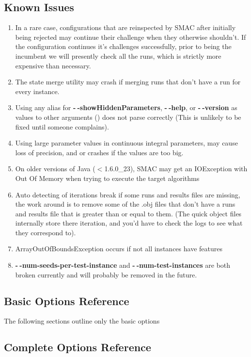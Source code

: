 \documentclass[11pt,letterpaper,oneside]{article}
\begin{document}
\subsection{Known Issues}
\label{known-issues}
\begin{enumerate}
\item In a rare case, configurations that are reinspected by SMAC after initially being rejected may continue their challenge when they otherwise shouldn't. If the configuration continues it's challenges successfully, prior to being the incumbent we will presently check all the runs, which is strictly more expensive than necessary.
\item The state merge utility may crash if merging runs that don't have a run for every instance.
\item Using any alias for \textbf{-$~\!$-showHiddenParameters}, \textbf{-$~\!$-help}, or \textbf{-$~\!$-version} as values to other arguments () does not parse correctly (This is unlikely to be fixed until someone complains).
\item Using large parameter values in continuous integral parameters, may cause loss of precision, and or crashes if the values are too big.
\item On older versions of Java ($<$1.6.0\_23), SMAC  may get an IOException with Out Of Memory when trying to execute the target algorithms
\item Auto detecting of iterations break if some runs and results files are missing, the work around is to remove some of the .obj files that don't have a runs and results file that is greater than or equal to them. (The quick object files internally store there iteration, and you'd have to check the logs to see what they correspond to).
\item ArrayOutOfBoundsException occurs if not all instances have features
\item \textbf{-$~\!$-num-seeds-per-test-instance} and \textbf{-$~\!$-num-test-instances} are both broken currently and will probably be removed in the future.

\end{enumerate}

\clearpage


\subsection{Basic Options Reference}
The following sections outline only the basic options
\label{sec:options-basic-ref}



\clearpage

\subsection{Complete Options Reference}
\label{sec:options-ref}

\end{document}
